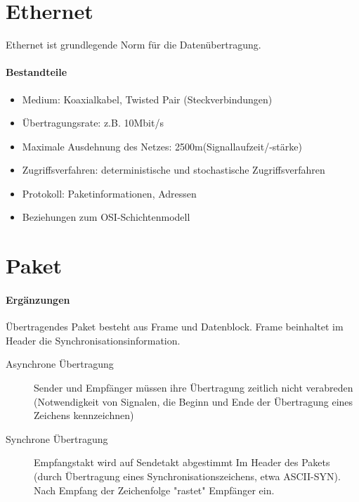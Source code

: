 \section{Ethernet}

Ethernet ist grundlegende Norm für die Datenübertragung. 

\paragraph{Bestandteile}
\begin{itemize}
\item Medium: Koaxialkabel, Twisted Pair (Steckverbindungen)
\item Übertragungsrate: z.B. 10Mbit/s
\item Maximale Ausdehnung des Netzes: 2500m(Signallaufzeit/-stärke)
\item Zugriffsverfahren: deterministische und stochastische Zugriffsverfahren
\item Protokoll: Paketinformationen, Adressen
\item Beziehungen zum OSI-Schichtenmodell
\end{itemize}


\section{Paket}

\paragraph{Ergänzungen}
Übertragendes Paket besteht aus Frame und Datenblock. %
Frame beinhaltet im Header die Synchronisationsinformation.

\begin{description}
\item[Asynchrone Übertragung] Sender und Empfänger müssen ihre Übertragung zeitlich nicht verabreden (Notwendigkeit von Signalen, die Beginn und Ende der Übertragung eines Zeichens kennzeichnen)
\item[Synchrone Übertragung] Empfangstakt wird auf Sendetakt abgestimmt
Im Header des Pakets (durch Übertragung eines Synchronisationszeichens, etwa ASCII-SYN). Nach Empfang der Zeichenfolge "rastet" Empfänger ein.
\end{description}

